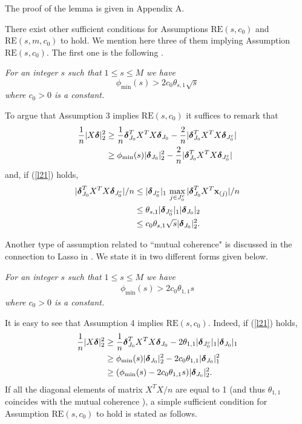 \documentclass[dvips,aos]{imsart}
\numberwithin{equation}{section}
\theoremstyle{plain}
\def\RE#1#2{$\text{RE}(#1,#2)$}
\def\REm#1#2#3{$\text{RE}(#1,#2,#3)$}
\newcommand{\bD}{\mbox{\boldmath$\delta$}}
\begin{document}
The proof of the lemma is given in Appendix A.


There exist other sufficient conditions for Assumptions \RE s{c_0}
and \REm sm{c_0} to hold. We mention here three of them implying
Assumption \RE s{c_0}. The first one is the following \cite{b07}.



 {\it For an integer $s$ such that
$1\le s \le M$ we have
$$
\phi_{\min}(s) > 2c_0 \theta_{s,1} \sqrt{s}
$$
where $c_0>0$ is a constant.}



To argue that Assumption 3 implies \RE s{c_0} it suffices to remark
that
\begin{equation*}\begin{split}%
\frac{1}{{n}}|X \bD|_2^2 &\ge\frac{1}{n} \bD_{J_0}^T X^T X
\bD_{J_{0}} - \frac{2}{n}|\bD_{J_0}^T X^T
X \bD_{J_{0}^c}|\\
%
&\ge \phi_{\min}(s)|\bD_{J_{0}}|_2^2 - \frac{2}{n}|\bD_{J_0}^T X^T X
\bD_{J_{0}^c}|
\end{split}\end{equation*}
and, if (\ref{l21}) holds,
\begin{eqnarray*}\label{dla4}
|\bD_{J_0}^T X^T  X \bD_{J_{0}^c}|/n&\le |\bD_{J_{0}^c}|_1
\,\max_{j\in J_0^c}|\bD_{J_{0}}^TX^T {\bf x}_{(j)}|/n
\\
%
&\le \theta_{s,1}|\bD_{J_{0}^c}|_1|\bD_{J_{0}}|_2
\\
%
&\le c_0\theta_{s,1}\sqrt{s}|\bD_{J_{0}}|_2^2.
\end{eqnarray*}


Another type of assumption related to ``mutual coherence"
\cite{det04} is discussed in the connection to Lasso in \cite{btw07,
btw06b}. We state it in two different forms given below.



 {\it For an integer $s$ such that
$1\le s \le M$ we have
\begin{equation*}\begin{split}%
\phi_{\min}(s) > 2c_0 \theta_{1,1} s
\end{split}\end{equation*}
where $c_0>0$ is a constant.}



It is easy to see that Assumption 4 implies \RE s{c_0}. Indeed, if
(\ref{l21}) holds,
\begin{equation}\begin{split}\label{dla7}
\frac{1}{{n}}|X \bD|_2^2 &\ge\frac{1}{n} \bD_{J_0}^T X^T X
\bD_{J_{0}} - 2\theta_{1,1} |\bD_{J_{0}^c}|_1|\bD_{J_{0}}|_1
\\
%
&\ge \phi_{\min}(s)|\bD_{J_{0}}|_2^2 - 2c_0 \theta_{1,1}
|\bD_{J_{0}}|_1^2
\\
%
&\ge (\phi_{\min}(s) - 2c_0 \theta_{1,1} s)|\bD_{J_{0}}|_2^2.
\end{split}\end{equation}
If all the diagonal elements of matrix $X^TX/n$ are equal to 1 (and
thus $\theta_{1,1}$ coincides with the mutual coherence
\cite{det04}), a simple sufficient condition for Assumption \RE
s{c_0} to hold is stated as follows.
\end{document}
